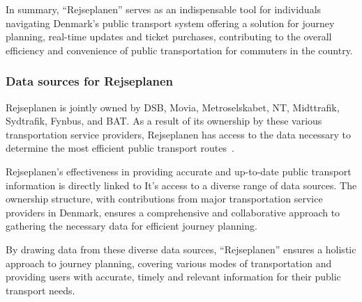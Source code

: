 In summary, ``Rejseplanen'' serves as an indispensable tool for individuals navigating Denmark's public transport system
offering a solution for journey planning, real-time updates and ticket purchases, contributing to the overall efficiency
and convenience of public transportation for commuters in the country.

\subsubsection{Data sources for Rejseplanen}\label{subsubsec:where-does-rejseplanen-get-their-data-from?}

Rejseplanen is jointly owned by DSB, Movia, Metroselskabet, NT, Midttrafik, Sydtrafik, Fynbus, and BAT\@.
As a result of its ownership by these various transportation service providers, Rejseplanen has access to the data
necessary to determine the most efficient public transport routes~\cite{rejseplanen2023}.

Rejseplanen's effectiveness in providing accurate and up-to-date public transport information is directly linked to It's
access to a diverse range of data sources.
The ownership structure, with contributions from major transportation service providers in Denmark, ensures a
comprehensive and collaborative approach to gathering the necessary data for efficient journey planning.

By drawing data from these diverse data sources, ``Rejseplanen'' ensures a holistic approach to journey planning,
covering various modes of transportation and providing users with accurate, timely and relevant information for their
public transport needs.
